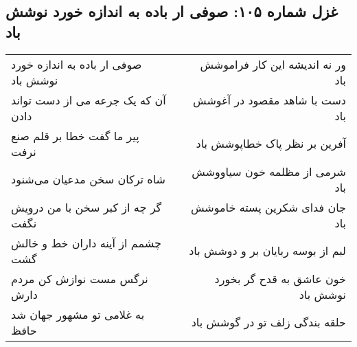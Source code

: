 \begin{center}
\section*{غزل شماره ۱۰۵: صوفی ار باده به اندازه خورد نوشش باد}
\label{sec:sh105}
\begin{longtable}{l p{0.5cm} r}
صوفی ار باده به اندازه خورد نوشش باد
&&
ور نه اندیشه این کار فراموشش باد
\\
آن که یک جرعه می از دست تواند دادن
&&
دست با شاهد مقصود در آغوشش باد
\\
پیر ما گفت خطا بر قلم صنع نرفت
&&
آفرین بر نظر پاک خطاپوشش باد
\\
شاه ترکان سخن مدعیان می‌شنود
&&
شرمی از مظلمه خون سیاووشش باد
\\
گر چه از کبر سخن با من درویش نگفت
&&
جان فدای شکرین پسته خاموشش باد
\\
چشمم از آینه داران خط و خالش گشت
&&
لبم از بوسه ربایان بر و دوشش باد
\\
نرگس مست نوازش کن مردم دارش
&&
خون عاشق به قدح گر بخورد نوشش باد
\\
به غلامی تو مشهور جهان شد حافظ
&&
حلقه بندگی زلف تو در گوشش باد
\\
\end{longtable}
\end{center}
